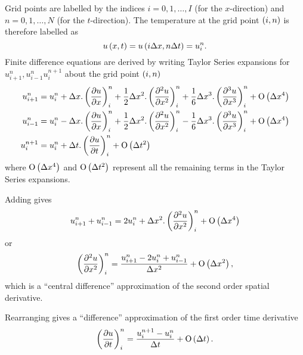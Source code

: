Grid points are labelled by the indices $i=0,1,\ldots,I$ (for the
$x$-direction) and $n=0,1,\ldots,N$ (for the $t$-direction). The temperature at the
grid point $\left( i,n \right)$ is therefore labelled as
\begin{equation}
   u\left( x,t \right) = u\left( i\Delta x, n\Delta t \right) =u_{i}^{n}.
  \label{eqn:temp}
\end{equation}
Finite difference equations are derived by writing Taylor Series expansions
for $u_{i+1}^{n},u_{i-1}^{n}u_{i}^{n+1}$ about the grid point $\left( i,n \right)$
\begin{align}
  u_{i+1}^{n}=u_{i}^{n} &+ \Delta x.\left(  \dfrac{\partial u}{\partial x}  \right)_{i}^{n}
  +\dfrac{1}{2} \Delta x^{2}.\left(  \dfrac{\partial^{2} u}{\partial {x}^{2}}  \right)_{i}^{n}
  +\frac{1}{6}\Delta x^{3}.\left( \frac{\partial^{3}u}{\partial x^{3}}
   \right)_{i}^{n}+ \mathrm{O}\left( \Delta x^{4} \right)  \label{eqn:Taylor1} \\ 
  u_{i-1}^{n}=u_{i}^{n} &- \Delta x.\left(  \dfrac{\partial u}{\partial x}  \right)_{i}^{n}
  +\dfrac{1}{2} \Delta x^{2}.\left(  \dfrac{\partial^{2} u}{\partial {x}^{2}}  \right)_{i}^{n}
  -\frac{1}{6}\Delta x^{3}.\left( \frac{\partial^{3}u}{\partial x^{3}}
   \right)_{i}^{n}+ \mathrm{O}\left( \Delta x^{4} \right)  \label{eqn:Taylor2} \\
  u_{i}^{n+1}=u_{i}^{n} &+ \Delta t.\left(  \dfrac{\partial u}{\partial t}  \right)_{i}^{n}
  + \mathrm{O}\left( \Delta t^{2} \right)  \label{eqn:Taylor3}
\end{align}
where $ \mathrm{O}\left( \Delta x^{4} \right) $ and $ \mathrm{O}\left( \Delta t^{2} \right) $ represent all the
remaining terms in the Taylor Series expansions.

Adding  gives
\begin{equation*}
  u_{i+1}^{n}+u_{i-1}^{n} = 2u_{i}^{n} + \Delta x^{2}.\left( 
     \dfrac{\partial^{2} u}{\partial {x}^{2}}  \right)_{i}^{n}+ \mathrm{O}\left( \Delta x^{4} \right) 
\end{equation*}  
or
\begin{equation}
  \left(  \dfrac{\partial^{2} u}{\partial {x}^{2}}  \right)_{i}^{n} = \dfrac{u_{i+1}^{n}
    -2u_{i}^{n}+u_{i-1}^{n}}{\Delta x^{2}} +  \mathrm{O}\left( \Delta x^{2} \right) ,
  \label{eqn:expns}
\end{equation} 
which is a ``central difference'' approximation of the second order spatial
derivative.

Rearranging  gives a ``difference'' approximation of the
first order time derivative
\begin{equation}
  \left(  \dfrac{\partial u}{\partial t}  \right)_{i}^{n} = \dfrac{u_{i}^{n+1} -u_{i}^{n}}{\Delta t}
  +  \mathrm{O}\left( \Delta t \right) .
  \label{eqn:fordiff}
\end{equation} 
 
